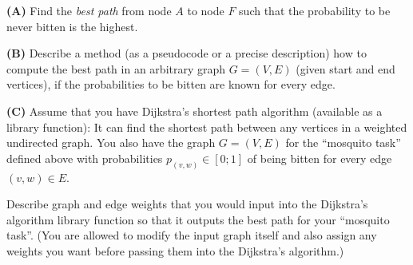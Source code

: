 \documentclass[a4paper,12pt]{article}
\begin{document}
\vspace{5pt}
{\bf (A)} Find the {\em best path} from node $A$ to node $F$ such that
the probability to be never bitten is the highest. 

\vspace{5pt}
{\bf (B)} Describe a method (as a pseudocode or 
a precise description) how to compute the best path
in an arbitrary graph $G=(V,E)$ 
(given start and end vertices), 
if the probabilities to be bitten 
are known for every edge. 


\vspace{5pt} 
{\bf (C)} Assume that you 
have Dijkstra's shortest path algorithm (available as a library function): 
It can find the shortest path between any vertices in a weighted undirected graph.  
You also have the graph $G=(V,E)$ for the ``mosquito task'' defined above 
with probabilities $p_{(v,w)} \in [0;1]$ of being 
bitten for every edge $(v,w) \in E$. 

Describe graph and edge weights that you would input into the Dijkstra's algorithm library function
so that it outputs the best path for your ``mosquito task''. (You are allowed to modify 
the input graph itself and also assign any weights you want before passing them into the Dijkstra's algorithm.)
\end{document}
